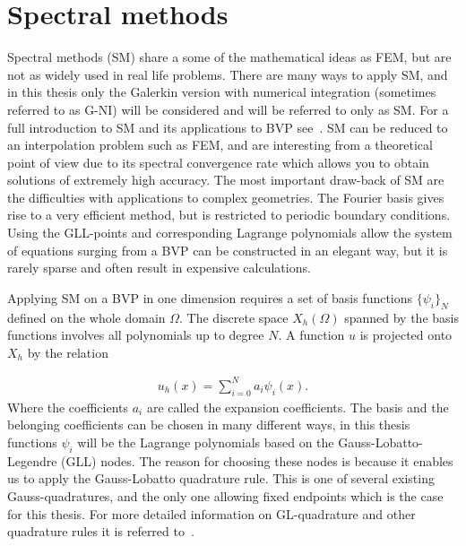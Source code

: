 
\section{Spectral methods}
Spectral methods (SM) share a some of the mathematical ideas as FEM, but are not as widely used in real life problems. 
There are many ways to apply SM, 
and in this thesis only the Galerkin version with numerical integration (sometimes referred to as G-NI) will be considered and will be referred to only as SM. 
For a full introduction to SM and its applications to BVP see~\cite{Canuto}.
SM can be reduced to an interpolation problem such as FEM, and are interesting from a theoretical point of view due to its 
spectral convergence rate which allows you to obtain solutions of extremely high accuracy. 
The most important draw-back of SM are the difficulties with applications to complex geometries. The Fourier basis
gives rise to a very efficient method, but is restricted to periodic boundary conditions. Using the GLL-points and
corresponding Lagrange polynomials allow the system of equations surging from
a BVP can be constructed in an elegant way, but it is rarely sparse and often result in expensive calculations. 

Applying SM on a BVP in one dimension requires a set of basis functions $\{\psi_i\}_N$ defined on the whole domain $\Omega$. 
The discrete space $X_h(\Omega)$ spanned by the basis functions involves all polynomials up to degree $N$.
A function $u$ is projected onto $X_h$ by the relation

\begin{align}
    u_h(x) = \sum_{i=0}^N a_i\psi_i(x).
    \label{eq:spectralprojection}
\end{align}
Where the coefficients $a_i$ are called the expansion coefficients. The basis and the belonging coefficients can be chosen in many different ways, 
in this thesis functions $\psi_i$ will be the Lagrange polynomials based on the Gauss-Lobatto-Legendre (GLL) nodes. 
The reason for choosing these nodes is because it enables us to apply the Gauss-Lobatto quadrature 
rule. This is one of several existing Gauss-quadratures, and the only one allowing fixed 
endpoints which is the case for this thesis. For more detailed information on GL-quadrature and 
other quadrature rules it is referred to~\cite{SM}.

